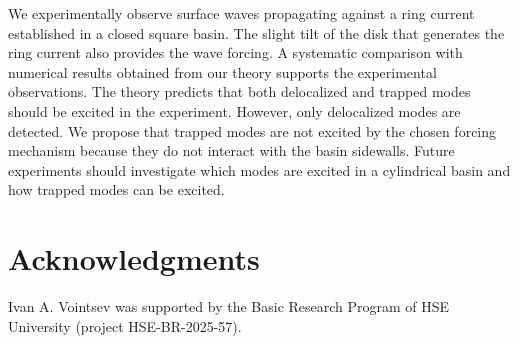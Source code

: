 \documentclass[aps,twocolumn]{revtex4-2}
\begin{document}
We experimentally observe surface waves propagating against a ring current established in a closed square basin. The slight tilt of the disk that generates the ring current also provides the wave forcing. A systematic comparison with numerical results obtained from our theory supports the experimental observations. The theory predicts that both delocalized and trapped modes should be excited in the experiment. However, only delocalized modes are detected. We propose that trapped modes are not excited by the chosen forcing mechanism because they do not interact with the basin sidewalls. Future experiments should investigate which modes are excited in a cylindrical basin and how trapped modes can be excited.



\section{Acknowledgments}

Ivan A. Vointsev was supported by the Basic Research Program of HSE University (project HSE-BR-2025-57).




\end{document}
